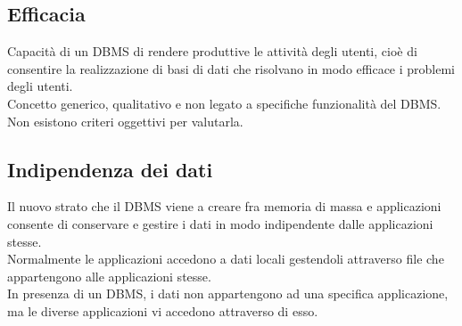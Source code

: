 \documentclass[../main.tex]{subfiles}
\begin{document}
	\subsection{Efficacia}
	Capacità di un DBMS di rendere produttive le attività degli utenti, cioè di consentire la realizzazione di basi di dati che risolvano in modo efficace i problemi degli utenti.\\
	Concetto generico, qualitativo e non legato a specifiche funzionalità del DBMS.\\
	Non esistono criteri oggettivi per valutarla.
	\subsection{Indipendenza dei dati}
	Il nuovo strato che il DBMS viene a creare fra memoria di massa e applicazioni consente di conservare e gestire i dati in modo indipendente dalle applicazioni stesse.\\
	Normalmente le applicazioni accedono a dati locali gestendoli attraverso file che appartengono alle applicazioni stesse.\\
	In presenza di un DBMS, i dati non appartengono ad una specifica applicazione, ma le diverse applicazioni vi accedono attraverso di esso.
\end{document}
